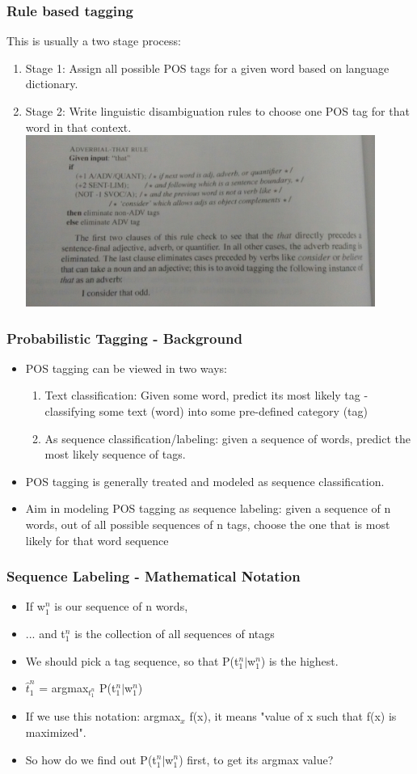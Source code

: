 \documentclass{beamer}
\begin{document}
\begin{frame}
\frametitle{Rule based tagging}
This is usually a two stage process:
\begin{enumerate}
\item Stage 1: Assign all possible POS tags for a given word based on language dictionary.
\item Stage 2: Write linguistic disambiguation rules to choose one POS tag for that word in that context.
\includegraphics[width=0.9\textwidth]{POSRules.jpg}
\end{enumerate}
\end{frame}

\begin{frame}
\frametitle{Probabilistic Tagging - Background}
\begin{itemize}
\item POS tagging can be viewed in two ways: 
\begin{enumerate}
\item Text classification: Given some word, predict its most likely tag - classifying some text (word) into some pre-defined category (tag)
\item As sequence classification/labeling: given a sequence of words, predict the most likely sequence of tags.
\end{enumerate}
\item POS tagging is generally treated and modeled as sequence classification. 
\item Aim in modeling POS tagging as sequence labeling: given a sequence of n words, out of all possible sequences of n tags, choose the one that is most likely for that word sequence
\end{itemize}
\end{frame}

\begin{frame}
\frametitle{Sequence Labeling - Mathematical Notation}
\begin{itemize}
\item If w$_1^n$ is our sequence of n words,
\item ... and t$_1^n$ is the collection of all sequences of ntags
\item We should pick a tag sequence, so that P(t$_1^n|$w$_1^n$) is the highest.
\item $\hat t_1^n$ = argmax$_{t_1^n}$ P(t$_1^n|$w$_1^n$)
\item If we use this notation: argmax$_x$ f(x), it means "value of x such that f(x) is maximized".
\item So how do we find out P(t$_1^n|$w$_1^n$) first, to get its argmax value?
\end{itemize}
\end{frame}
\end{document}
